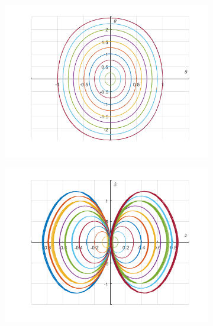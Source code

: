 \documentclass{article}
\begin{document}
	\begin{figure}[h!]
		\graphicspath{{./SmallOscillations/S1} }
		\centering
		\begin{subfigure}[b]{0.48\linewidth}
			\includegraphics[width=\linewidth]{./SmallOscillations/S2/F5.png}
		\end{subfigure}
		\begin{subfigure}[b]{0.48\linewidth}
			\includegraphics[width=\linewidth]{./SmallOscillations/S2/F6.png}
		\end{subfigure}
	\end{figure}
	\newpage
\end{document}
